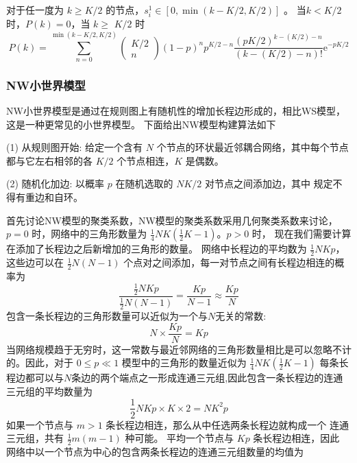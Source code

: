 对于任一度为 $k \geqslant K / 2$ 的节点，$s_i^1 \in[0,\min (k-K / 2,K / 2)]$ 。
当$k<K/2$时，$P(k)=0$，当 $k \geqslant$ $K / 2$ 时
\begin{equation}
    P(k)=\sum_{n=0}^{\min (k-K / 2,K / 2)}\left(\begin{array}{c}
    K / 2 \\
    n
    \end{array}\right)(1-p)^n p^{K / 2-n} \frac{(p K / 2)^{k-(K / 2)-n}}{(k-(K / 2)-n) !} \mathrm{e}^{-p K / 2}
\end{equation}
\subsubsection{NW小世界模型}
NW小世界模型是通过在规则图上有随机性的增加长程边形成的，相比WS模型，这是一种更常见的小世界模型。
下面给出NW模型构建算法如下\par
\noindent(1) 从规则图开始: 给定一个含有 $N$ 个节点的环状最近邻耦合网络，其中每个节点都与它左右相邻的各 $K / 2$ 个节点相连，$K$ 是偶数。\par
\noindent(2) 随机化加边: 以概率 $p$ 在随机选取的 $NK / 2$ 对节点之间添加边，其中 规定不得有重边和自环。\par
首先讨论NW模型的聚类系数，NW模型的聚类系数采用几何聚类系数来讨论，$p=0$ 时，网络中的三角形数量为 
$\frac{1}{4} N K\left(\frac{1}{2} K-1\right)$。$ p>0$ 时，
现在我们需要计算在添加了长程边之后新增加的三角形的数量。 网络中长程边的平均数为 $\frac{1}{2} N K p$，
这些边可以在 $\frac{1}{2} N(N-1)$ 个点对之间添加，每一对节点之间有长程边相连的概率为
\begin{equation}
    \frac{\frac{1}{2} N K p}{\frac{1}{2} N(N-1)}=\frac{K p}{N-1} \approx \frac{K p}{N}
 \end{equation}
 包含一条长程边的三角形数量可以近似为一个与$N$无关的常数:
 \begin{equation}
    N \times \frac{K p}{N}=K p
\end{equation}
当网络规模趋于无穷时，这一常数与最近邻网络的三角形数量相比是可以忽略不计的。因此，对于 $0 \leqslant p \ll 1$ 
模型中的三角形的数量近似为 $\frac{1}{4} N K\left(\frac{1}{2} K-1\right) $
每条长程边都可以与$N$条边的两个端点之一形成连通三元组,因此包含一条长程边的连通三元组的平均数量为
\begin{equation}
    \frac{1}{2} N K p \times K \times 2=N K^2 p
\end{equation}
如果一个节点与 $m>1$ 条长程边相连，那么从中任选两条长程边就构成一个 连通三元组，共有 $\frac{1}{2} m(m-1)$ 种可能。
平均一个节点与 $K p$ 条长程边相连，因此 网络中以一个节点为中心的包含两条长程边的连通三元组数量的均值为
